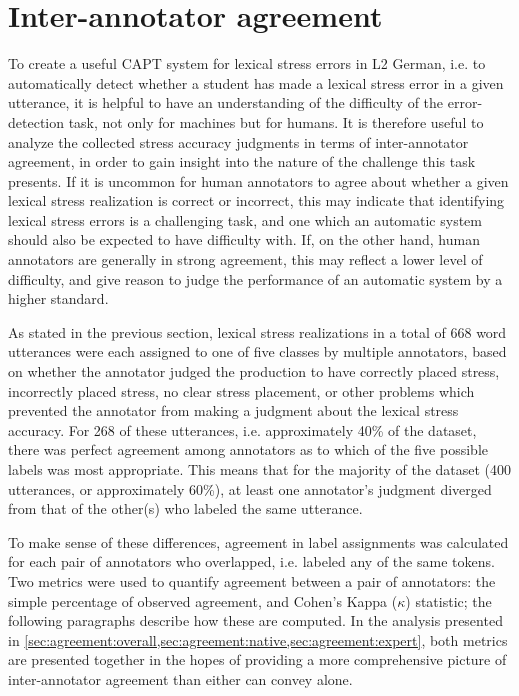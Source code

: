 	
	\section{Inter-annotator agreement}
	\label{sec:lexstress:agreement}	
	
	To create a useful CAPT system for lexical stress errors in L2 German, i.e. to automatically detect whether a student has made a lexical stress error in a given utterance, it is helpful to have an understanding of the difficulty of the error-detection task, not only for machines but for humans. It is therefore useful to analyze the collected stress accuracy judgments in terms of inter-annotator agreement, in order to gain insight into the nature of the challenge this task presents. If it is uncommon for human annotators to agree about whether a given lexical stress realization is correct or incorrect, this may indicate that  identifying lexical stress errors is a challenging task, and one which an automatic system should also be expected to have difficulty with. If, on the other hand, human annotators are generally in strong agreement, this may reflect a lower level of difficulty, and give reason to judge the performance of an automatic system by a higher standard.  
	
	As stated in the previous section,
	lexical stress realizations in a total of 
	668 word utterances were each assigned to one of five classes by multiple annotators, based on whether the annotator judged the production to have correctly placed stress, incorrectly placed stress, no clear stress placement, or other problems which prevented the annotator from making a judgment about the lexical stress accuracy. 
	For 268 of these utterances, i.e. approximately 40\% of the dataset, there was perfect agreement among annotators as to which of the five possible labels was most appropriate. This means that for the majority of the dataset (400 utterances, or approximately 60\%), at least one annotator's judgment diverged from that of the other(s) who labeled the same utterance.
	
	
	To make sense of these differences,  
	agreement in label assignments was calculated for each pair of annotators who overlapped, i.e. labeled any of the same tokens. 
		Two metrics were used to quantify agreement between a pair of annotators: the simple percentage of observed agreement, and Cohen's Kappa ($\kappa$) statistic; the following paragraphs describe how these are computed. In the analysis presented in \cref{sec:agreement:overall,sec:agreement:native,sec:agreement:expert}, both metrics are presented together in the hopes of providing a more comprehensive picture of inter-annotator agreement than either can convey alone.  
		
